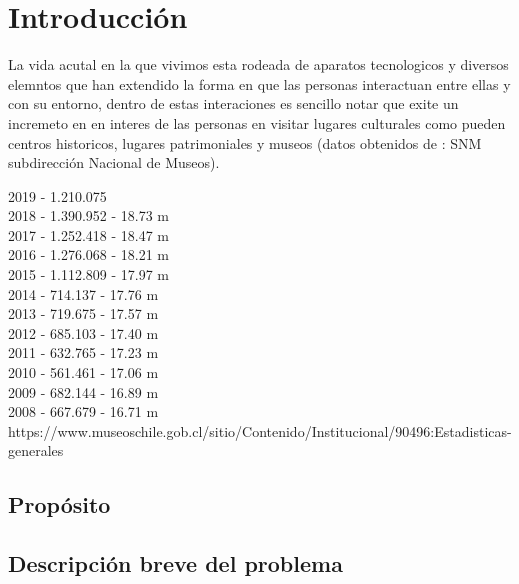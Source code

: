 \section{Introducción}
La vida acutal en la que vivimos esta rodeada de aparatos tecnologicos y diversos elemntos que han extendido la forma en que las personas interactuan entre ellas y con su entorno, dentro de estas interaciones es sencillo notar que exite un incremeto en en interes de las personas en visitar lugares culturales como pueden centros historicos, lugares patrimoniales y museos (datos obtenidos de : SNM subdirección Nacional de Museos).




2019 - 1.210.075\\
2018 - 1.390.952 - 18.73 m\\
2017 - 1.252.418 - 18.47 m\\
2016 - 1.276.068 - 18.21 m\\
2015 - 1.112.809 - 17.97 m\\
2014 - 714.137 - 17.76 m\\
2013 - 719.675 - 17.57 m\\
2012 - 685.103 - 17.40 m\\
2011 - 632.765 - 17.23 m\\
2010 - 561.461 - 17.06 m\\
2009 - 682.144 - 16.89 m\\
2008 - 667.679 - 16.71 m\\
https://www.museoschile.gob.cl/sitio/Contenido/Institucional/90496:Estadisticas-generales\\

\subsection{Propósito}
\subsection{Descripción breve del problema}